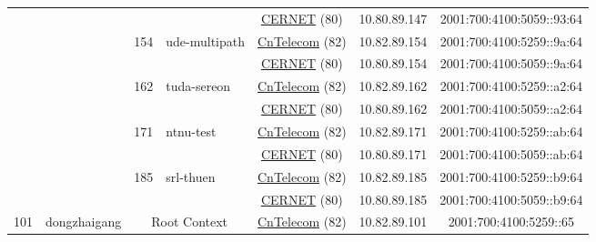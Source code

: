 \begin{small}
\begin{center}
\begin{longtable}{|c|c|c|c|c|c|c|c|}
  &  &  &  & \multicolumn{2}{|c|}{\tiny{\href{http://www.cernet.edu.cn}{CERNET} (80)}} & \tiny{10.80.89.147} & \tiny{2001:700:4100:5059::93:64} \\* \cline{3-3}\cline{4-4}\cline{5-5}\cline{6-6}\cline{7-7}\cline{8-8}
  &  & \multirow{2}{*}{\tiny{154}} & \multicolumn{1}{|l|}{\multirow{2}{*}{\tiny{ude-multipath}}} & \multicolumn{2}{|c|}{\tiny{\href{http://www.chinatelecom.com.cn}{CnTelecom} (82)}} & \tiny{10.82.89.154} & \tiny{2001:700:4100:5259::9a:64} \\* \cline{5-5}\cline{6-6}\cline{7-7}\cline{8-8}
  &  &  &  & \multicolumn{2}{|c|}{\tiny{\href{http://www.cernet.edu.cn}{CERNET} (80)}} & \tiny{10.80.89.154} & \tiny{2001:700:4100:5059::9a:64} \\* \cline{3-3}\cline{4-4}\cline{5-5}\cline{6-6}\cline{7-7}\cline{8-8}
  &  & \multirow{2}{*}{\tiny{162}} & \multicolumn{1}{|l|}{\multirow{2}{*}{\tiny{tuda-sereon}}} & \multicolumn{2}{|c|}{\tiny{\href{http://www.chinatelecom.com.cn}{CnTelecom} (82)}} & \tiny{10.82.89.162} & \tiny{2001:700:4100:5259::a2:64} \\* \cline{5-5}\cline{6-6}\cline{7-7}\cline{8-8}
  &  &  &  & \multicolumn{2}{|c|}{\tiny{\href{http://www.cernet.edu.cn}{CERNET} (80)}} & \tiny{10.80.89.162} & \tiny{2001:700:4100:5059::a2:64} \\* \cline{3-3}\cline{4-4}\cline{5-5}\cline{6-6}\cline{7-7}\cline{8-8}
  &  & \multirow{2}{*}{\tiny{171}} & \multicolumn{1}{|l|}{\multirow{2}{*}{\tiny{ntnu-test}}} & \multicolumn{2}{|c|}{\tiny{\href{http://www.chinatelecom.com.cn}{CnTelecom} (82)}} & \tiny{10.82.89.171} & \tiny{2001:700:4100:5259::ab:64} \\* \cline{5-5}\cline{6-6}\cline{7-7}\cline{8-8}
  &  &  &  & \multicolumn{2}{|c|}{\tiny{\href{http://www.cernet.edu.cn}{CERNET} (80)}} & \tiny{10.80.89.171} & \tiny{2001:700:4100:5059::ab:64} \\* \cline{3-3}\cline{4-4}\cline{5-5}\cline{6-6}\cline{7-7}\cline{8-8}
  &  & \multirow{2}{*}{\tiny{185}} & \multicolumn{1}{|l|}{\multirow{2}{*}{\tiny{srl-thuen}}} & \multicolumn{2}{|c|}{\tiny{\href{http://www.chinatelecom.com.cn}{CnTelecom} (82)}} & \tiny{10.82.89.185} & \tiny{2001:700:4100:5259::b9:64} \\* \cline{5-5}\cline{6-6}\cline{7-7}\cline{8-8}
  &  &  &  & \multicolumn{2}{|c|}{\tiny{\href{http://www.cernet.edu.cn}{CERNET} (80)}} & \tiny{10.80.89.185} & \tiny{2001:700:4100:5059::b9:64} \\ \hline
 \multirow{18}{*}{\tiny{101}} & \multicolumn{1}{|l|}{\multirow{18}{*}{\tiny{dongzhaigang}}} & \multicolumn{2}{|c|}{\multirow{2}{*}{\tiny{Root Context}}} & \multicolumn{2}{|c|}{\tiny{\href{http://www.chinatelecom.com.cn}{CnTelecom} (82)}} & \tiny{10.82.89.101} & \tiny{2001:700:4100:5259::65} \\* \cline{5-5}\cline{6-6}\cline{7-7}\cline{8-8}

\end{longtable}
\end{center}
\end{small}
